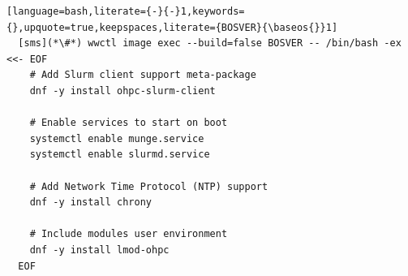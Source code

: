 \begin{lstlisting}[language=bash,literate={-}{-}1,keywords={},upquote=true,keepspaces,literate={BOSVER}{\baseos{}}1]
  [sms](*\#*) wwctl image exec --build=false BOSVER -- /bin/bash -ex <<- EOF
    # Add Slurm client support meta-package
    dnf -y install ohpc-slurm-client

    # Enable services to start on boot
    systemctl enable munge.service
    systemctl enable slurmd.service

    # Add Network Time Protocol (NTP) support
    dnf -y install chrony

    # Include modules user environment
    dnf -y install lmod-ohpc
  EOF
\end{lstlisting}
